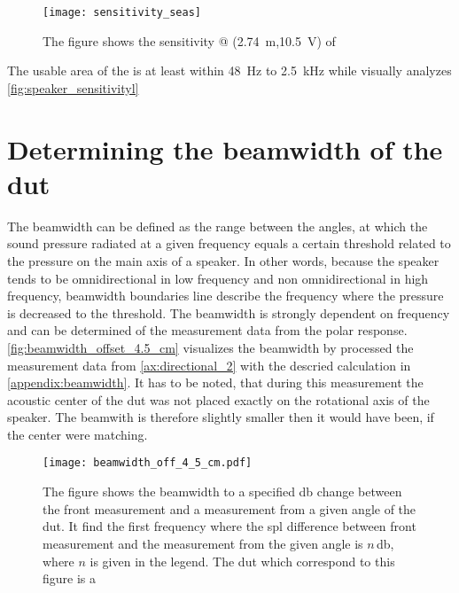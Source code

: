\begin{figure}[H]
	\centering
	\texttt{[image: sensitivity\_seas]}
	\caption{The figure shows the sensitivity @ (\SI{2.74}{\meter},\SI{10.5}{\volt}) of  \citep{seas33}}
		\label{fig:speaker_sensitivityl}
\end{figure}

The usable area of the \citep{seas33} is at least within \SI{48}{\hertz} to \SI{2.5}{\kilo\hertz} while visually analyzes \autoref{fig:speaker_sensitivityl}


\section{Determining the beamwidth of the \gls{dut}}\label{sec:beamwidth}
The beamwidth can be defined as the range between the angles, at which the sound pressure radiated at a given frequency equals a certain threshold related to the pressure on the main axis of a speaker. In other words, because the speaker tends to be omnidirectional in low frequency and non omnidirectional in high frequency, beamwidth boundaries line describe the frequency where the pressure is decreased to the threshold. The beamwidth is strongly dependent on frequency and can be determined of the measurement data from the polar response. \autoref{fig:beamwidth_offset_4.5_cm} visualizes the beamwidth by processed the measurement data from \ref{ax:directional_2} with the descried calculation in \autoref{appendix:beamwidth}. It has to be noted, that during this measurement the acoustic center of the \gls{dut} was not placed exactly on the rotational axis of the speaker. The beamwith is therefore slightly smaller then it would have been, if the center were matching.

\begin{figure}[H]
	\centering
	\texttt{[image: beamwidth\_off\_4\_5\_cm.pdf]}
	\caption{The figure shows the beamwidth to a specified \si{\decibel} change between the front measurement and a measurement from a given angle of the \gls{dut}. It find the first frequency where the \gls{spl} difference between front measurement and the measurement from the given angle is $n$\,\si{\decibel}, where $n$ is given in the legend. The \gls{dut} which correspond to this figure is a \citep{seas33}}
		\label{fig:beamwidth_offset_4.5_cm}
\end{figure}